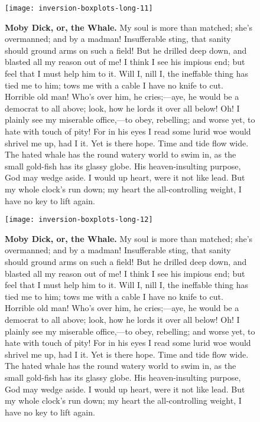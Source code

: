 \documentclass{article}
\begin{document}
\begin{figure}[!htp]
  \begin{center}
      \texttt{[image: inversion-boxplots-long-11]}
    \caption{
        \textbf{Moby Dick, or, the Whale.}
My soul is more than matched; she's overmanned; and by a madman! Insufferable sting, that sanity should ground arms on such a field! But he drilled deep down, and blasted all my reason out of me! I think I see his impious end; but feel that I must help him to it. Will I, nill I, the ineffable thing has tied me to him; tows me with a cable I have no knife to cut. Horrible old man! Who's over him, he cries;—aye, he would be a democrat to all above; look, how he lords it over all below! Oh! I plainly see my miserable office,—to obey, rebelling; and worse yet, to hate with touch of pity! For in his eyes I read some lurid woe would shrivel me up, had I it. Yet is there hope. Time and tide flow wide. The hated whale has the round watery world to swim in, as the small gold-fish has its glassy globe. His heaven-insulting purpose, God may wedge aside. I would up heart, were it not like lead. But my whole clock's run down; my heart the all-controlling weight, I have no key to lift again. 
    }
  \end{center}
\end{figure}

\begin{figure}[!htp]
  \begin{center}
      \texttt{[image: inversion-boxplots-long-12]}
    \caption{
        \textbf{Moby Dick, or, the Whale.}
My soul is more than matched; she's overmanned; and by a madman! Insufferable sting, that sanity should ground arms on such a field! But he drilled deep down, and blasted all my reason out of me! I think I see his impious end; but feel that I must help him to it. Will I, nill I, the ineffable thing has tied me to him; tows me with a cable I have no knife to cut. Horrible old man! Who's over him, he cries;—aye, he would be a democrat to all above; look, how he lords it over all below! Oh! I plainly see my miserable office,—to obey, rebelling; and worse yet, to hate with touch of pity! For in his eyes I read some lurid woe would shrivel me up, had I it. Yet is there hope. Time and tide flow wide. The hated whale has the round watery world to swim in, as the small gold-fish has its glassy globe. His heaven-insulting purpose, God may wedge aside. I would up heart, were it not like lead. But my whole clock's run down; my heart the all-controlling weight, I have no key to lift again. 
    }
  \end{center}
\end{figure}
\end{document}
